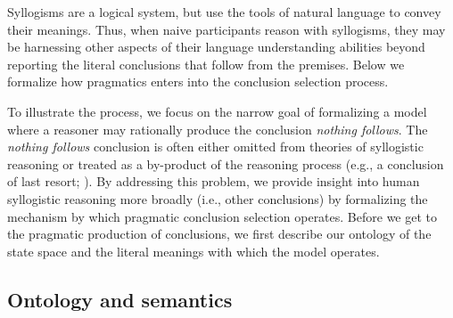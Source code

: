 \documentclass[floatsintext, doc]{apa6}
\begin{document}
Syllogisms are a logical system, but use the tools of natural language to convey their meanings. 
Thus, when naive participants reason with syllogisms, they may be harnessing other aspects of their language understanding abilities beyond reporting the literal conclusions that follow from the premises.
Below we formalize how pragmatics enters into the conclusion selection process. 

To illustrate the process, we focus on the narrow goal of formalizing a model where a reasoner may rationally produce the conclusion \emph{nothing follows}. 
The \emph{nothing follows} conclusion is often either omitted from theories of syllogistic reasoning or treated as a by-product of the reasoning process (e.g., a conclusion of last resort; ).
By addressing this problem, we provide insight into human syllogistic reasoning more broadly (i.e., other conclusions) by formalizing the mechanism by which pragmatic conclusion selection operates. 
Before we get to the pragmatic production of conclusions, we first describe our ontology of the state space and the literal meanings with which the model operates.
%



\subsection{Ontology and semantics}
\end{document}
